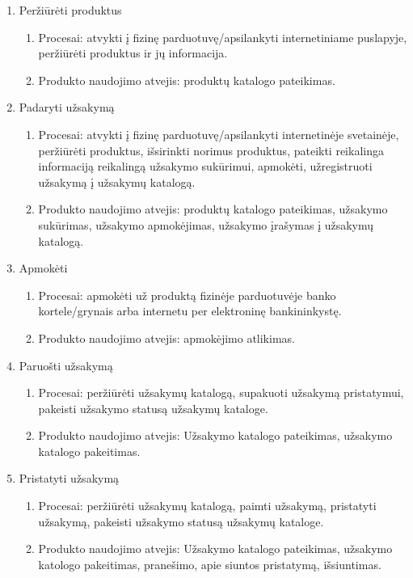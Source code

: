 \documentclass{VUMIFPSkursinis}
\begin{document}
\begin{enumerate}
	\item Peržiūrėti produktus
	\begin{enumerate}
		\item Procesai: atvykti į fizinę parduotuvę/apsilankyti internetiniame puslapyje, peržiūrėti produktus ir jų informacija.
		\item Produkto naudojimo atvejis: produktų katalogo pateikimas.
	\end{enumerate}
	\item Padaryti užsakymą
	\begin{enumerate}
		\item Procesai: atvykti į fizinę parduotuvę/apsilankyti internetinėje svetainėje, peržiūrėti produktus, išsirinkti norimus produktus, pateikti reikalinga informaciją reikalingą užsakymo sukūrimui, apmokėti, užregistruoti užsakymą į užsakymų katalogą.
		\item Produkto naudojimo atvejis: produktų katalogo pateikimas, užsakymo sukūrimas, užsakymo apmokėjimas, užsakymo įrašymas į užsakymų katalogą.
	\end{enumerate}
	\item Apmokėti
	\begin{enumerate}
		\item Procesai: apmokėti už produktą fizinėje parduotuvėje banko kortele/grynais arba internetu per elektroninę bankininkystę.
		\item Produkto naudojimo atvejis: apmokėjimo atlikimas.
	\end{enumerate}
	\item Paruošti užsakymą
	\begin{enumerate}
		\item Procesai: peržiūrėti užsakymų katalogą, supakuoti užsakymą pristatymui, pakeisti užsakymo statusą užsakymų kataloge.
		\item Produkto naudojimo atvejis: Užsakymo katalogo pateikimas, užsakymo katalogo pakeitimas.
	\end{enumerate}
	\item Pristatyti užsakymą
	\begin{enumerate}
		\item Procesai: peržiūrėti užsakymų katalogą, paimti užsakymą, pristatyti užsakymą, pakeisti užsakymo statusą užsakymų kataloge.
		\item Produkto naudojimo atvejis: Užsakymo katalogo pateikimas, užsakymo katologo pakeitimas, pranešimo, apie siuntos pristatymą, išsiuntimas.
	\end{enumerate}
\end{enumerate}
\end{document}
